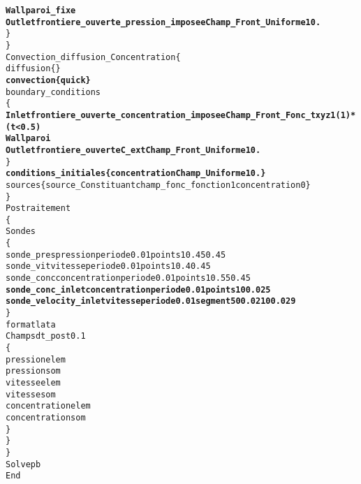 \begin{alltt}
            {\bf{Wall    paroi_fixe}}
            {\bf{Outlet  frontiere_ouverte_pression_imposee Champ_Front_Uniforme 1 0.}}
        \}
    \}
    Convection_diffusion_Concentration \{
        diffusion \{ \}
        {\bf{convection \{ quick \} }}
        boundary_conditions 
        \{
            {\bf{Inlet   frontiere_ouverte_concentration_imposee Champ_Front_Fonc_txyz 1 (1)*(t<0.5)}}
            {\bf{Wall    paroi}}
            {\bf{Outlet  frontiere_ouverte C_ext Champ_Front_Uniforme 1 0.}}
        \}
        {\bf{conditions_initiales \{ concentration Champ_Uniforme 1 0. \} }}
        sources \{ source_Constituant champ_fonc_fonction 1 concentration 0 \}
    \}
    Postraitement
    \{
        Sondes
        \{
            sonde_pres pression periode 0.01 points 1 0.45 0.45
            sonde_vit vitesse periode 0.01 points 1 0.4 0.45
            sonde_conc concentration periode 0.01 points 1 0.55 0.45
            {\bf{sonde_conc_inlet concentration periode 0.01 points 1 0 0.025 }}
            {\bf{sonde_velocity_inlet vitesse periode 0.01 segment 5 0 0.021 0 0.029}}
        \}
        format lata
        Champs dt_post 0.1
        \{
            pression elem
            pression som
            vitesse elem
            vitesse som
            concentration elem
            concentration som
        \}
    \}
\}
Solve pb
End
\end{alltt}
